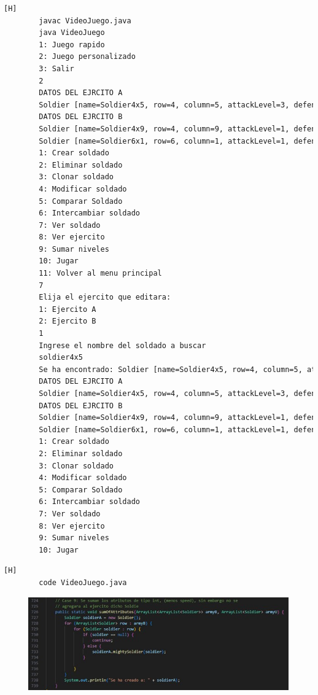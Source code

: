 \documentclass{article}
\begin{document}
	\begin{lstlisting}[language=bash,caption={Compilando y probando el binarySearch  }][H]
		javac VideoJuego.java
		java VideoJuego
		1: Juego rapido
		2: Juego personalizado
		3: Salir
		2
		DATOS DEL EJRCITO A
		Soldier [name=Soldier4x5, row=4, column=5, attackLevel=3, defenseLevel=1, actualLife=3, speed=0, attitude=Repose, current=true]
		DATOS DEL EJRCITO B
		Soldier [name=Soldier4x9, row=4, column=9, attackLevel=1, defenseLevel=5, actualLife=1, speed=0, attitude=Repose, current=true]
		Soldier [name=Soldier6x1, row=6, column=1, attackLevel=1, defenseLevel=4, actualLife=1, speed=0, attitude=Repose, current=true]
		1: Crear soldado
		2: Eliminar soldado
		3: Clonar soldado
		4: Modificar soldado
		5: Comparar Soldado
		6: Intercambiar soldado
		7: Ver soldado
		8: Ver ejercito
		9: Sumar niveles
		10: Jugar
		11: Volver al menu principal
		7
		Elija el ejercito que editara:
		1: Ejercito A
		2: Ejercito B
		1
		Ingrese el nombre del soldado a buscar
		soldier4x5
		Se ha encontrado: Soldier [name=Soldier4x5, row=4, column=5, attackLevel=3, defenseLevel=1, actualLife=3, speed=0, attitude=Repose, current=true]
		DATOS DEL EJRCITO A
		Soldier [name=Soldier4x5, row=4, column=5, attackLevel=3, defenseLevel=1, actualLife=3, speed=0, attitude=Repose, current=true]
		DATOS DEL EJRCITO B
		Soldier [name=Soldier4x9, row=4, column=9, attackLevel=1, defenseLevel=5, actualLife=1, speed=0, attitude=Repose, current=true]
		Soldier [name=Soldier6x1, row=6, column=1, attackLevel=1, defenseLevel=4, actualLife=1, speed=0, attitude=Repose, current=true]
		1: Crear soldado
		2: Eliminar soldado
		3: Clonar soldado
		4: Modificar soldado
		5: Comparar Soldado
		6: Intercambiar soldado
		7: Ver soldado
		8: Ver ejercito
		9: Sumar niveles
		10: Jugar
	\end{lstlisting}
	
	
	
	
	
	
	
	\begin{lstlisting}[language=bash,caption={Se implementa el método para sumar los atributos de un ArrayList de Soldier }][H]
		code VideoJuego.java
	\end{lstlisting}
	
	\begin{figure}[H]
		\centering
		\includegraphics[width=1\textwidth,keepaspectratio]{img/sumAttributes.jpg}
	\end{figure}
	
\end{document}
